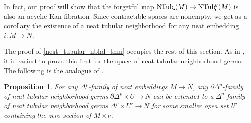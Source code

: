 \documentclass[11pt]{amsart}
\newtheorem{prop}{Proposition}[section]
\theoremstyle{definition}
\newtheorem{rem}{Remark}[section]
\numberwithin{equation}{section}
\numberwithin{figure}{section}
\newcommand{\NTub}{\textup{NTub}}
\newcommand{\sbt}{\,\begin{picture}(-1,1)(0.5,-1)\circle*{1.8}\end{picture}\hspace{.05cm}}
\begin{document}
In fact, our proof will show that the forgetful map $\NTub_{\sbt}(M) \to \NTub_{\sbt}^g(M)$ is also an acyclic Kan fibration. Since contractible spaces are nonempty, we get as a corollary the existence of a neat tubular neighborhood for any neat embedding $i\colon M \to N$.

The proof of \autoref{neat_tubular_nbhd_thm} occupies the rest of this section. As in \cite[Theorem 2.40]{GIMM1}, it is easiest to prove this first for the space of neat tubular neighborhood germs. The following is the analogue of \cite[Prop 2.42]{GIMM1}.

\begin{prop}\label{ntn_step1}
	For any $\Delta^p$-family of neat embeddings $M \to N$, any $\partial \Delta^p$-family of neat tubular neighborhood germs $\partial \Delta^p \times U \to N$ can be extended to a $\Delta^p$-family of neat tubular neighborhood germs $\Delta^p \times U' \to N$ for some smaller open set $U'$ containing the zero section of $M \times \nu$.
\end{prop}
\end{document}
